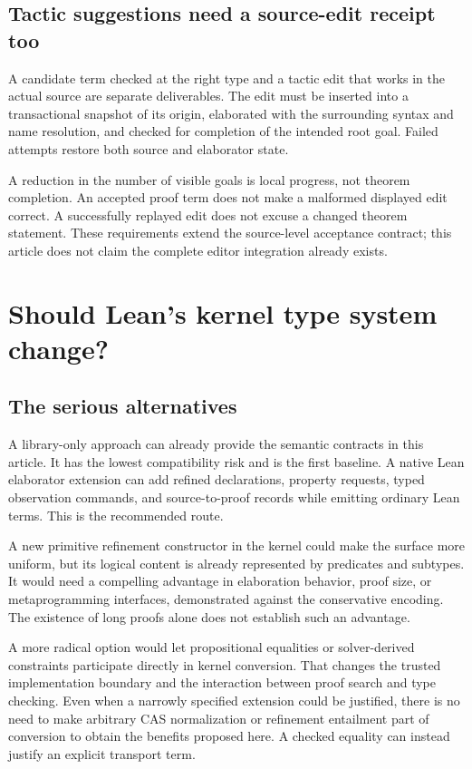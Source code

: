 \documentclass[11pt,letterpaper]{article}
\theoremstyle{remark}
\begin{document}
\subsection{Tactic suggestions need a source-edit receipt too}
A candidate term checked at the right type and a tactic edit that works in the
actual source are separate deliverables. The edit must be inserted into a
transactional snapshot of its origin, elaborated with the surrounding syntax
and name resolution, and checked for completion of the intended root goal.
Failed attempts restore both source and elaborator state.

A reduction in the number of visible goals is local progress, not theorem
completion. An accepted proof term does not make a malformed displayed edit
correct. A successfully replayed edit does not excuse a changed theorem
statement. These requirements extend the source-level acceptance contract;
this article does not claim the complete editor integration already exists.

\section{Should Lean's kernel type system change?}\label{sec:kernel}

\subsection{The serious alternatives}
A library-only approach can already provide the semantic contracts in this
article. It has the lowest compatibility risk and is the first baseline.
A native Lean elaborator extension can add refined declarations, property
requests, typed observation commands, and source-to-proof records while
emitting ordinary Lean terms. This is the recommended route.

A new primitive refinement constructor in the kernel could make the surface
more uniform, but its logical content is already represented by predicates
and subtypes. It would need a compelling advantage in elaboration behavior,
proof size, or metaprogramming interfaces, demonstrated against the conservative
encoding. The existence of long proofs alone does not establish such an
advantage.

A more radical option would let propositional equalities or solver-derived
constraints participate directly in kernel conversion. That changes the
trusted implementation boundary and the interaction between proof search and
type checking. Even when a narrowly specified extension could be justified,
there is no need to make arbitrary CAS normalization or refinement entailment
part of conversion to obtain the benefits proposed here. A checked equality
can instead justify an explicit transport term.
\end{document}
